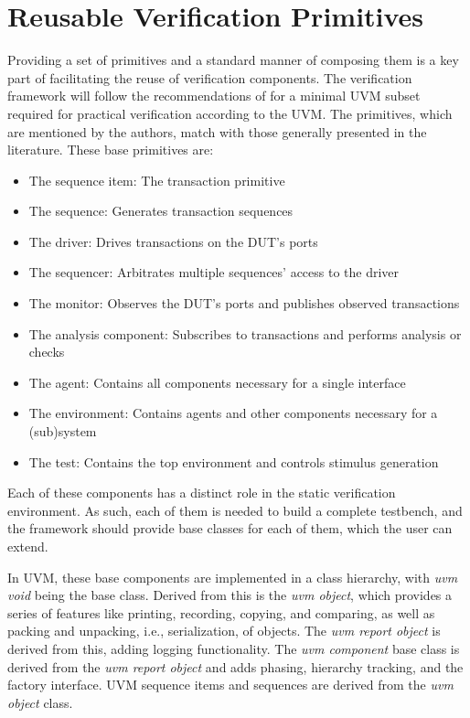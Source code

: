 \section{Reusable Verification Primitives} %

Providing a set of primitives and a standard manner of composing them is a key part of facilitating the reuse of
verification components. The verification framework will follow the recommendations of \citeauthor{sutherland2015uvm}
\cite{sutherland2015uvm} for a minimal UVM subset required for practical verification according to the UVM. The
primitives, which are mentioned by the authors, match with those generally presented in the literature. These base primitives are:

\begin{itemize}
  \item The sequence item: The transaction primitive
  \item The sequence: Generates transaction sequences
  \item The driver: Drives transactions on the DUT's ports
  \item The sequencer: Arbitrates multiple sequences' access to the driver
  \item The monitor: Observes the DUT's ports and publishes observed transactions
  \item The analysis component: Subscribes to transactions and performs analysis or checks
  \item The agent: Contains all components necessary for a single interface
  \item The environment: Contains agents and other components necessary for a (sub)system
  \item The test: Contains the top environment and controls stimulus generation
\end{itemize}

Each of these components has a distinct role in the static verification environment. As such, each of them is needed to build a complete testbench, and the framework should
provide base classes for each of them, which the user can extend.

In UVM, these base components are implemented in a class hierarchy, with \textit{uvm void} being the base class. Derived
from this is the \textit{uvm object}, which provides a series of features like printing, recording, copying, and comparing,
as well as packing and unpacking, i.e., serialization, of objects. The \textit{uvm report object} is derived from
this, adding logging functionality. The \textit{uvm component} base class is derived from the \textit{uvm report
object} and adds phasing, hierarchy tracking, and the factory interface. UVM sequence items and sequences are derived
from the \textit{uvm object} class.

